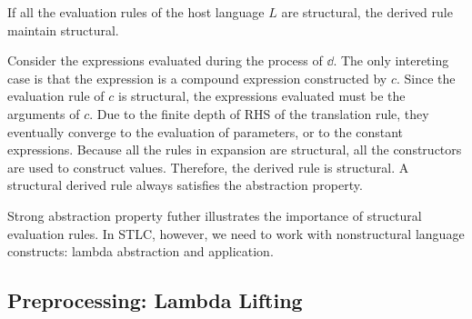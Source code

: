 
\begin{theorem}
  If all the evaluation rules of the host language $L$ are structural,
  the derived rule maintain structural.
\end{theorem}


Consider the expressions evaluated during the process of $\dd$.
The only intereting case is that the expression is a compound expression constructed by $c$.
Since the evaluation rule of $c$ is structural, the expressions evaluated must be the arguments of $c$.
Due to the finite depth of RHS of the translation rule,
  they eventually converge to the evaluation of parameters,
  or to the constant expressions.
Because all the rules in expansion are structural, all the constructors are used to construct values.
Therefore, the derived rule is structural.
A structural derived rule always satisfies the abstraction property.

Strong abstraction property futher illustrates the importance of structural evaluation rules.
In STLC, however, we need to work with nonstructural language constructs: lambda abstraction and application.

\subsection{Preprocessing: Lambda Lifting}


